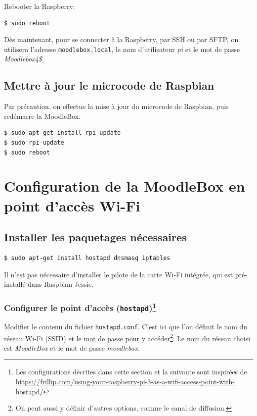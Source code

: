 \documentclass[11pt]{article}
\begin{document}
Rebooter la Raspberry:
\begin{lstlisting}[language=bash]
$ sudo reboot
\end{lstlisting}

Dès maintenant, pour se connecter à la Raspberry, par SSH ou par SFTP, on utilisera l'adresse \lstinline{moodlebox.local}, le nom d'utilisateur \emph{pi} et le mot de passe \emph{Moodlebox4\$}.

\subsection{Mettre à jour le microcode de Raspbian}

Par précaution, on effectue la mise à jour du microcode de Raspbian, puis redémarre la MoodleBox.

\begin{lstlisting}[language=bash]
$ sudo apt-get install rpi-update
$ sudo rpi-update
$ sudo reboot
\end{lstlisting}

\section{Configuration de la MoodleBox en point d'accès Wi-Fi}

\subsection{Installer les paquetages nécessaires}

\begin{lstlisting}[language=bash]
$ sudo apt-get install hostapd dnsmasq iptables
\end{lstlisting}

Il n'est pas nécessaire d'installer le pilote de la carte Wi-Fi intégrée, qui est pré-installé dans Raspbian Jessie.

\subsubsection[Configurer le point d'accès (\lstinline{hostapd})]{Configurer le point d'accès (\lstinline{hostapd})\footnote{Les configurations décrites dans cette section et la suivante sont inspirées de \url{https://frillip.com/using-your-raspberry-pi-3-as-a-wifi-access-point-with-hostapd/}}}

Modifier le contenu du fichier \lstinline{hostapd.conf}. C'est ici que l'on définit le nom du réseau Wi-Fi (SSID) et le mot de passe pour y accéder\footnote{On peut aussi y définir d'autres options, comme le canal de diffusion.}. Le nom du réseau choisi est \emph{MoodleBox} et le mot de passe \emph{moodlebox}.
\end{document}
